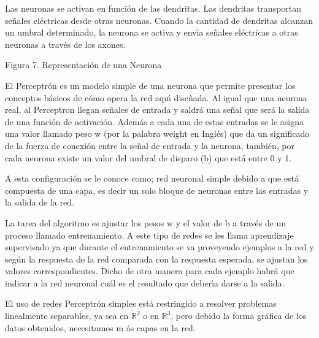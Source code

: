Las neuronas se activan en funci\'{o}n de las dendritas. Las dendritas
transportan se\~{n}ales el\'{e}ctricas desde otras neuronas. Cuando la
cantidad de dendritas alcanzan un umbral determinado, la neurona se activa y
env\'{\i}a se\~{n}ales el\'{e}ctricas a otras neuronas a trav\'{e}s de los
axones.

\begin{center}
\qquad \qquad \qquad \qquad {}

\qquad \qquad \qquad \qquad Figura 7. Representaci\'{o}n de una Neurona
\end{center}

El Perceptr\'{o}n es un modelo simple de una neurona que permite presentar
los conceptos b\'{a}sicos de c\'{o}mo opera la red aqu\'{\i} dise\~{n}ada.
Al igual que una neurona real, al Perceptron llegan se\~{n}ales de entrada y
saldr\'{a} una se\~{n}al que ser\'{a} la salida de una funci\'{o}n de
activaci\'{o}n. Adem\'{a}s a cada una de estas entradas se le asigna una
valor llamado peso w (por la palabra weight en Ingl\'{e}s) que da un
significado de la fuerza de conexi\'{o}n entre la se\~{n}al de entrada y la
neurona, tambi\'{e}n, por cada neurona existe un valor del umbral de disparo
(b) que est\'{a} entre 0 y 1.

A esta configuraci\'{o}n se le conoce como; red neuronal simple debido a que
est\'{a} compuesta de una capa, es decir un solo bloque de neuronas entre
las entradas y la salida de la red.

La tarea del algoritmo es ajustar los pesos w y el valor de b a trav\'{e}s
de un proceso llamado entrenamiento. A este tipo de redes se les llama
aprendizaje supervisado ya que durante el entrenamiento se va proveyendo
ejemplos a la red y seg\'{u}n la respuesta de la red comparada con la
respuesta esperada, se ajustan los valores correspondientes. Dicho de otra
manera para cada ejemplo habr\'{a} que indicar a la red neuronal cu\'{a}l es
el resultado que deber\'{\i}a darse a la salida.

El uso de redes Perceptr\'{o}n simples est\'{a} restringido a resolver
problemas linealmente separables, ya sea en $%
\mathbb{R}
^{2}$ o en $%
\mathbb{R}
^{3}$, pero debido la forma gr\'{a}fica de los datos obtenidos, necesitamos m%
\'{a}s capas en la red.

